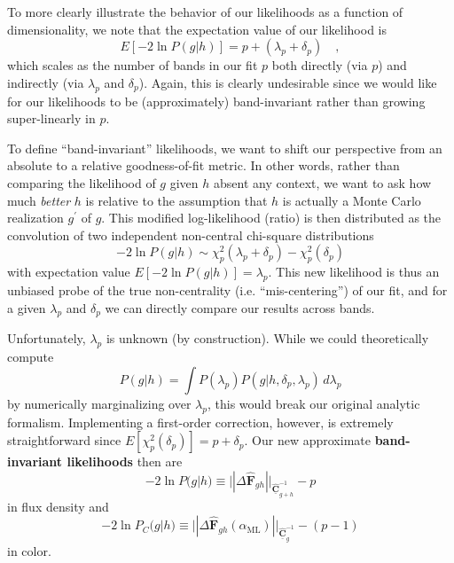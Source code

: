\documentclass[a4paper,fleqn,usenatbib,english]{mnras}
\newcommand{\rom}[2]{\ensuremath{#1_{\mathrm{#2}}}} %
\begin{document}
To more clearly illustrate the behavior of our likelihoods as a function of dimensionality, we note that the expectation value of our likelihood is
\begin{equation}
E\left[ -2 \ln P(g|h) \right] = p + (\lambda_p + \delta_p) \quad ,
\end{equation}
which scales as the number of bands in our fit $p$ both directly (via $p$) and indirectly (via $\lambda_p$ and $\delta_p$). Again, this is clearly undesirable since we would like for our likelihoods to be (approximately) band-invariant rather than growing super-linearly in $p$.

To define ``band-invariant'' likelihoods, we want to shift our perspective from an absolute to a relative goodness-of-fit metric. In other words, rather than comparing the likelihood of $g$ given $h$ absent any context, we want to ask how much \textit{better} $h$ is relative to the assumption that $h$ is actually a Monte Carlo realization $g^\prime$ of $g$. This modified log-likelihood (ratio) is then distributed as the convolution of two independent non-central chi-square distributions
\begin{equation}
-2 \ln P(g|h) \sim \chi^2_p(\lambda_p + \delta_p) - \chi^2_p(\delta_p)
\end{equation}
with expectation value $E\left[-2 \ln P(g|h)\right] = \lambda_p$. This new likelihood is thus an unbiased probe of the true non-centrality (i.e. ``mis-centering'') of our fit, and for a given $\lambda_p$ and $\delta_p$ we can directly compare our results across bands.

Unfortunately, $\lambda_p$ is unknown (by construction). While we could theoretically compute
\begin{equation}
P(g|h) = \int P(\lambda_p) P(g|h,\delta_p,\lambda_p) \, d\lambda_p
\end{equation}
by numerically marginalizing over $\lambda_p$, this would break our original analytic formalism. Implementing a first-order correction, however, is extremely straightforward since $E\left[\chi^2_p(\delta_p)\right]=p+\delta_p$. Our new approximate \textbf{band-invariant likelihoods} then are
\begin{equation}\label{eq:like_flux_bandinv}
\boxed{
-2\ln P(g|h) \equiv ||\Delta\mathbf{\hat{F}}_{gh}||_{\underline{\mathbf{\hat{C}}}_{g+h}^{-1}} - p
}
\end{equation}
in flux density and
\begin{equation}\label{eq:like_color_bandinv}
\boxed{
-2 \ln P_C(g|h) \equiv ||\Delta\mathbf{\hat{F}}_{gh}(\rom{\alpha}{ML})||_{\underline{\mathbf{\hat{C}}}_g^{-1}} - (p-1)
}
\end{equation}
in color.
\end{document}
